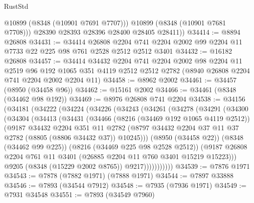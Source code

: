 \begin{lexlean}{RustStd}
\begin{coremodule}
            @10899
            (@8348 (@10901 @7691 @7707)))
          @10899
          (@8348 (@10901 @7681 @7708)))
        @28390
        @28393
        @28396
        @28400
        @28405
        @28411))
@34414 := @8894 @26808
@34431 := @34414
    @26808
    @2204
    @741
    @2204
    @2002
    @99
    @2204
    @11
    @7733
    @22
    @225
    @98
    @761
    @2528
    @2512
    @2512
    @3401
@34432 := @16182 @26808
@34457 := @34414
    @34432
    @2204
    @741
    @2204
    @2002
    @98
    @2204
    @11
    @2519
    @96
    @192
    @1065
    @351
    @4119
    @2512
    @2512
    @2782
    (@8940 @26808 @2204 @741 @2204 @2002 @2204 @11)
@34458 := @8962 @2002
@34461 := @34457 (@8950 (@34458 @96))
@34462 := @15161 @2002
@34466 := @34461 (@8348 (@34462 @98 @192))
@34469 := @8976 @26808 @741 @2204
@34538 := @34156
    (@34181
      (@34222
        (@34224
          (@34226
            (@34243
              (@34261
                (@34278
                  (@34291
                    (@34300
                      (@34304
                        (@34413
                          (@34431
                            (@34466
                              (@8216 (@34469 @192 @1065 @4119 @2512))
                              (@9187
                                @34432
                                @2204
                                @351
                                @11
                                @2782
                                (@8797
                                  @34432
                                  @2204
                                  @37
                                  @11
                                  @37
                                  @2782
                                  (@8805 (@8806 @34432 @37))
                                  @10245)))
                            (@8950 (@34458 @22))
                            (@8348 (@34462 @99 @225))
                            (@8216 (@34469 @225 @98 @2528 @2512))
                            (@9187
                              @26808
                              @2204
                              @761
                              @11
                              @3401
                              (@26885 @2204 @11 @760 @3401 @15219 @15223)))
                          @9205
                          (@8348 (@15229 @2002 @8765))
                          @9217)))))))))))
@34539 := @7876 @1971
@34543 := @7878 (@7882 @1971) (@7888 @1971)
@34544 := @7897 @33888
@34546 := @7893 (@34544 @7912)
@34548 := @7935 (@7936 @1971)
@34549 := @7931 @34548
@34551 := @7893 (@34549 @7960)

\end{coremodule}
\end{lexlean}
